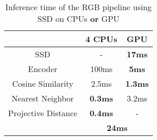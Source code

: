 \begin{table}[t]
		\scriptsize
		\centering
		\captionsetup{width=0.8\columnwidth}
		\caption{Inference time of the RGB pipeline using SSD on CPUs \textbf{or} GPU}
\begin{tabular}{ccc}
			\toprule
			& 4 CPUs & GPU\\
			\midrule
			SSD & - & \textbf{17ms}\\
			Encoder & 100ms & \textbf{5ms}\\
			Cosine Similarity & 2.5ms & \textbf{1.3ms}\\
			Nearest Neighbor &	\textbf{0.3ms} &	3.2ms\\
			Projective Distance &	\textbf{0.4ms} &	-\\
			\midrule
			&\multicolumn{2}{c}{\textbf{24ms}}\\
		\end{tabular}
\label{tab:infer}
\end{table}
